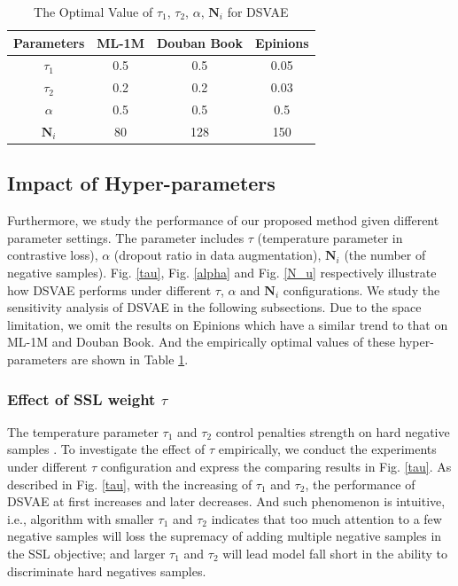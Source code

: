 \begin{table}[]
\begin{center}
    \caption{The Optimal Value of $\tau_1$, $\tau_2$, $\alpha$, $\mathbf{N}_i$ for DSVAE}\label{tab5}
\begin{tabular}{cccc}
\hline \hline
\textbf{Parameters} & \textbf{ML-1M} & \textbf{Douban Book} & \textbf{Epinions} \\ \hline
$\tau_1$ & 0.5 & 0.5 & 0.05   \\
$\tau_2$ & 0.2 & 0.2 & 0.03 \\
$\alpha$  & 0.5 & 0.5 & 0.5    \\
$\mathbf{N}_i$   & 80  & 128 & 150 \\ \hline \hline
\end{tabular}
\end{center}
\end{table}

\subsection{Impact of Hyper-parameters}\label{45}
Furthermore, we study the performance of our proposed method given different parameter settings. The parameter includes $\tau$ (temperature parameter in contrastive loss), $\alpha$ (dropout ratio in data augmentation), $\mathbf{N}_i$ (the number of negative samples). Fig. \ref{tau}, Fig. \ref{alpha} and Fig. \ref{N_u} respectively illustrate how DSVAE performs under different $\tau$, $\alpha$ and $\mathbf{N}_i$ configurations. We study the sensitivity
analysis of DSVAE in the following subsections. Due to the space limitation, we omit the results on Epinions which have a similar trend to that on ML-1M and Douban Book. And the empirically optimal values of these hyper-parameters are shown in Table \ref{tab5}.


\subsubsection{Effect of SSL weight $\tau$}\label{subsubsec2}
The temperature parameter $\tau_1$ and $\tau_2$ control penalties strength on hard negative samples \cite{DBLP:journals/corr/abs-2012-09740}. To investigate the effect of $\tau$ empirically, we conduct the experiments
under different $\tau$ configuration and express the comparing
results in Fig. \ref{tau}.
As described in Fig. \ref{tau}, with the increasing of $\tau_1$ and $\tau_2$, the performance of  DSVAE at first increases and later decreases. And such phenomenon is intuitive, i.e.,
algorithm with smaller $\tau_1$ and $\tau_2$ indicates that too much attention to a few negative samples will loss the supremacy of adding multiple negative samples in the SSL objective; and larger $\tau_1$ and $\tau_2$ will lead model fall short in the ability to discriminate hard negatives samples.


